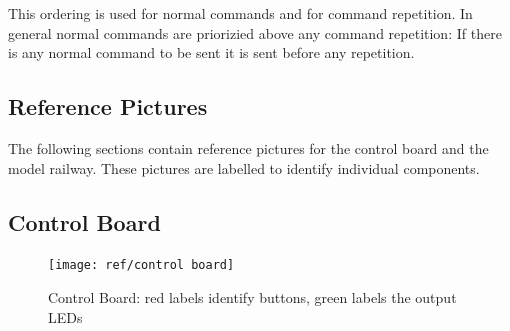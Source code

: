 \documentclass{scrreprt}
\begin{document}
This ordering is used for normal commands and for command repetition.
In general normal commands are priorizied above any command repetition:
If there is any normal command to be sent it is sent before any repetition.

\begin{appendices}
\chapter{Reference Pictures}
The following sections contain reference pictures for the control board and the model railway.
These pictures are labelled to identify individual components.

\pagebreak
\section{Control Board}
\begin{figure}[h!]
    \centering
    \texttt{[image: ref/control board]}
    \caption{Control Board: red labels identify buttons, green labels the output LEDs }
\end{figure}


\end{appendices}
\end{document}

